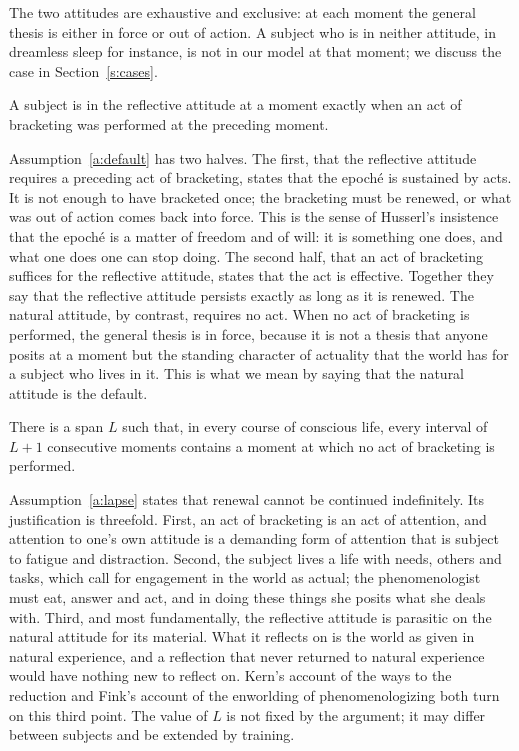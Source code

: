 \documentclass{situationist-preprint}
\begin{document}
The two attitudes are exhaustive and exclusive: at each moment the general thesis is either in force or out of action. A subject who is in neither attitude, in dreamless sleep for instance, is not in our model at that moment; we discuss the case in Section~\ref{s:cases}.

\begin{assumption}\label{a:default}
A subject is in the reflective attitude at a moment exactly when an act of bracketing was performed at the preceding moment.
\end{assumption}

Assumption~\ref{a:default} has two halves. The first, that the reflective attitude requires a preceding act of bracketing, states that the epoché is sustained by acts. It is not enough to have bracketed once; the bracketing must be renewed, or what was out of action comes back into force. This is the sense of Husserl's insistence that the epoché is a matter of freedom and of will: it is something one does, and what one does one can stop doing. The second half, that an act of bracketing suffices for the reflective attitude, states that the act is effective. Together they say that the reflective attitude persists exactly as long as it is renewed. The natural attitude, by contrast, requires no act. When no act of bracketing is performed, the general thesis is in force, because it is not a thesis that anyone posits at a moment but the standing character of actuality that the world has for a subject who lives in it. This is what we mean by saying that the natural attitude is the default.

\begin{assumption}[Lapse]\label{a:lapse}
There is a span $L$ such that, in every course of conscious life, every interval of $L+1$ consecutive moments contains a moment at which no act of bracketing is performed.
\end{assumption}

Assumption~\ref{a:lapse} states that renewal cannot be continued indefinitely. Its justification is threefold. First, an act of bracketing is an act of attention, and attention to one's own attitude is a demanding form of attention that is subject to fatigue and distraction. Second, the subject lives a life with needs, others and tasks, which call for engagement in the world as actual; the phenomenologist must eat, answer and act, and in doing these things she posits what she deals with. Third, and most fundamentally, the reflective attitude is parasitic on the natural attitude for its material. What it reflects on is the world as given in natural experience, and a reflection that never returned to natural experience would have nothing new to reflect on. Kern's account of the ways to the reduction and Fink's account of the enworlding of phenomenologizing both turn on this third point. The value of $L$ is not fixed by the argument; it may differ between subjects and be extended by training.
\end{document}

